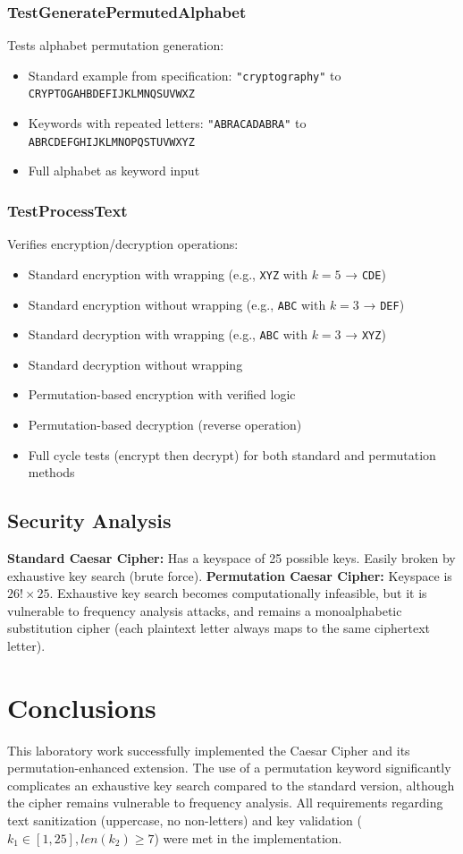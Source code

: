 \documentclass[a4paper,12pt]{article}
\begin{document}
\subsubsection{TestGeneratePermutedAlphabet}
\label{sec:org0ebb39a}
Tests alphabet permutation generation:
\begin{itemize}
\item Standard example from specification: \texttt{"cryptography"} to \texttt{CRYPTOGAHBDEFIJKLMNQSUVWXZ}
\item Keywords with repeated letters: \texttt{"ABRACADABRA"} to \texttt{ABRCDEFGHIJKLMNOPQSTUVWXYZ}
\item Full alphabet as keyword input
\end{itemize}
\subsubsection{TestProcessText}
\label{sec:org8aa3858}
Verifies encryption/decryption operations:
\begin{itemize}
\item Standard encryption with wrapping (e.g., \texttt{XYZ} with \(k=5\) → \texttt{CDE})
\item Standard encryption without wrapping (e.g., \texttt{ABC} with \(k=3\) → \texttt{DEF})
\item Standard decryption with wrapping (e.g., \texttt{ABC} with \(k=3\) → \texttt{XYZ})
\item Standard decryption without wrapping
\item Permutation-based encryption with verified logic
\item Permutation-based decryption (reverse operation)
\item Full cycle tests (encrypt then decrypt) for both standard and permutation methods
\end{itemize}
\subsection{Security Analysis}
\label{sec:org980a81c}
\textbf{Standard Caesar Cipher:}
Has a keyspace of 25 possible keys.
Easily broken by exhaustive key search (brute force).
\textbf{Permutation Caesar Cipher:}
Keyspace is \(26! \times 25\). Exhaustive key search becomes computationally infeasible, but it is vulnerable to frequency analysis attacks, and remains a monoalphabetic substitution cipher
(each plaintext letter always maps to the same ciphertext letter).
\section{Conclusions}
\label{sec:org08b8186}
This laboratory work successfully implemented the Caesar Cipher and its permutation-enhanced extension. The use of a permutation keyword significantly complicates an exhaustive key search compared to the standard version, although the cipher remains vulnerable to frequency analysis. All requirements regarding text sanitization (uppercase, no non-letters) and key validation (\(k_{1}\in[1,25], len(k_{2})\ge7\)) were met in the implementation.
\end{document}
